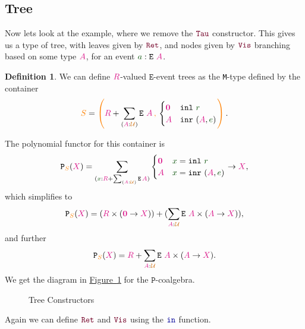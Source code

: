 \documentclass[twoside,11pt,openright]{report}
\theoremstyle{plain} %
\theoremstyle{definition}
\newtheorem{defn}[thm]{Definition}%
\theoremstyle{remark}
\newcommand*{\figref}[1]{\hyperref[fig:#1]{Figure~\ref*{fig:#1}}}
\newcommand*{\term}[1]{\textcolor{green!30!black}{#1}} %
\newcommand*{\type}[1]{\textcolor{magenta!90!black}{#1}}
\newcommand*{\container}[1]{\textcolor{orange}{#1}}
\newcommand*{\containerpair}[2]{\ensuremath{\colorlet{savedleftcolor}{.}\color{orange}\left(\color{savedleftcolor}#1\,\textcolor{orange}{\mathbf{,}}\,#2\color{orange}\right)\color{savedleftcolor}}}
\newcommand*{\universe}[1]{\textcolor{orange!80!black}{#1}}
\newcommand*{\empt}{\type{\textbf{0}}}
\newcommand*{\function}[1]{\textcolor{blue!60!black}{\ensuremath{\mathtt{#1}}}}
\newcommand*{\constructor}[1]{\textcolor{purple!60!black}{\ensuremath{\mathtt{#1}}}}
\newcommand*{\typeformer}[1]{\ensuremath{\mathtt{#1}}}
\newcommand*{\functor}[1]{\ensuremath{\mathbf{\mathtt{#1}}}}
\begin{document}
\subsection{Tree}
Now lets look at the example, where we remove the \(\constructor{Tau}\) constructor. This gives us a type of tree, with leaves given by \(\constructor{Ret}\), and nodes given by \(\constructor{Vis}\) branching based on some type \(\type{A}\), for an event \(\term{a} : \typeformer{E}~\type{A}\). 
\begin{defn}
  We can define \(\type{R}\)-valued \(\typeformer{E}\)-event trees as the \texttt{M}-type defined by the container
  \begin{equation}
    \container{S} = \containerpair{\type{R} + \sum_{(\type{A} : \universe{\mathcal{U}})} \typeformer{E}~\type{A}}{\begin{cases}\empt & \mathtt{inl}~\term{r} \\ \type{A} & \mathtt{inr}~(\type{A},\term{e})\end{cases}}.
  \end{equation}
\end{defn}
\noindent The polynomial functor for this container is
\begin{equation}
  \functor{P}_{\container{S}}(\type{X}) = \sum_{(\term{x} : \type{R} + \sum_{(\type{A} : \universe{\mathcal{U}})} \typeformer{E}\,\type{A})} \begin{cases}\empt & \term{x} = \mathtt{inl}~\term{r} \\ \type{A} & \term{x} = \mathtt{inr}~(\type{A},\term{e})\end{cases} \rightarrow \type{X},
\end{equation}
which simplifies to
\begin{equation}
  \functor{P}_{\container{S}}(\type{X}) = (\type{R} \times (\empt \rightarrow \type{X})) + (\sum_{\type{A} : \universe{\mathcal{U}}} \typeformer{E}~\type{A} \times (\type{A} \rightarrow \type{X})),
\end{equation}
and further
\begin{equation}
  \functor{P}_{\container{S}}(\type{X}) = \type{R} + \sum_{\type{A} : \universe{\mathcal{U}}} \typeformer{E}~\type{A} \times (\type{A} \rightarrow \type{X}).
\end{equation}
We get the diagram in \figref{tree-constructors} for the \(\functor{P}\)-coalgebra.
\begin{figure}[h]
  \centering
  \caption{Tree Constructors}
  \label{fig:tree-constructors}
\end{figure}
\noindent Again we can define \(\constructor{Ret}\) and \(\constructor{Vis}\) using the \(\function{in}\) function.
\end{document}
